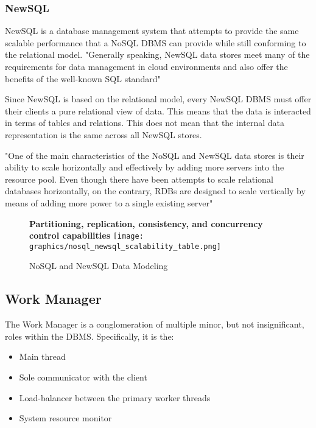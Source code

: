 \documentclass[letterpaper, 12pt]{article}
\begin{document}
\subsubsection{NewSQL}
NewSQL is a database management system that attempts to provide
the same scalable performance that a NoSQL DBMS can provide while still conforming to 
the relational model. "Generally speaking, NewSQL data stores meet many of the 
requirements for data management in cloud environments and also offer the benefits of 
the well-known SQL standard"\cite{grolinger2013data}
\par\vspace{\baselineskip}
Since NewSQL is based on the relational model, every NewSQL DBMS must offer their clients
a pure relational view of data. This means that the data is interacted in terms of tables
and relations. This does not mean that the internal data representation is the same across
all NewSQL stores. 
\par\vspace{\baselineskip}
"One of the main characteristics of the NoSQL and NewSQL data stores is their ability to 
scale horizontally and effectively by adding more servers into the resource pool. Even 
though there have been attempts to scale relational databases horizontally, on the contrary, 
RDBs are designed to scale vertically by means of adding more power to a single existing 
server"\cite{grolinger2013data}

\begin{figure}
  \centering
  \textbf{Partitioning, replication, consistency, and concurrency control capabilities}
  \texttt{[image: graphics/nosql\_newsql\_scalability\_table.png]}
  \caption{NoSQL and NewSQL Data Modeling}
\end{figure}

\newpage

\subsection{Work Manager}
The Work Manager is a conglomeration of multiple minor, but not insignificant, roles
within the DBMS. Specifically, it is the:
\begin{itemize}
  \item Main thread
  \item Sole communicator with the client
  \item Load-balancer between the primary worker threads
  \item System resource monitor
\end{itemize}
\end{document}
